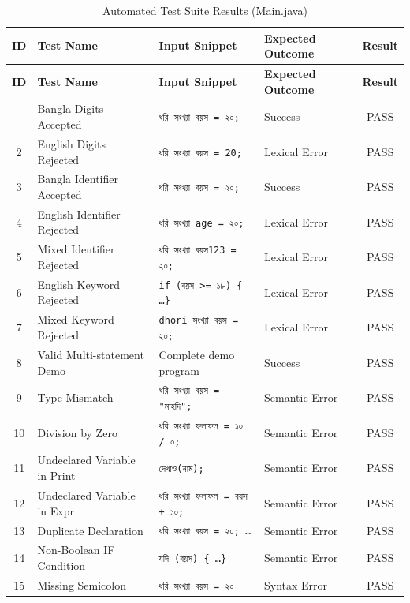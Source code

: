 \documentclass[12pt, a4paper]{report}
\begin{document}
\renewcommand{\arraystretch}{1.25}
\noindent\begin{longtable}{|c|>{\raggedright\arraybackslash}p{2.8cm}|>{\raggedright\arraybackslash}p{3.8cm}|>{\raggedright\arraybackslash}p{3.8cm}|c|}
\hline
\textbf{ID} & \textbf{Test Name} & \textbf{Input Snippet} & \textbf{Expected Outcome} & \textbf{Result} \\
\hline
\endfirsthead
\hline
\textbf{ID} & \textbf{Test Name} & \textbf{Input Snippet} & \textbf{Expected Outcome} & \textbf{Result} \\
\hline
\endhead
\hline
\endfoot
\hline
\caption{Automated Test Suite Results (Main.java)}
\label{tab:test_suite}
\endlastfoot
1 & Bangla Digits Accepted & \texttt{ধরি সংখ্যা বয়স = ২০;} & Success & PASS \\
\hline
2 & English Digits Rejected & \texttt{ধরি সংখ্যা বয়স = 20;} & Lexical Error & PASS \\
\hline
3 & Bangla Identifier Accepted & \texttt{ধরি সংখ্যা বয়স = ২০;} & Success & PASS \\
\hline
4 & English Identifier Rejected & \texttt{ধরি সংখ্যা age = ২০;} & Lexical Error & PASS \\
\hline
5 & Mixed Identifier Rejected & \texttt{ধরি সংখ্যা বয়স123 = ২০;} & Lexical Error & PASS \\
\hline
6 & English Keyword Rejected & \texttt{if (বয়স >= ১৮) \{ \dots \}} & Lexical Error & PASS \\
\hline
7 & Mixed Keyword Rejected & \texttt{dhori সংখ্যা বয়স = ২০;} & Lexical Error & PASS \\
\hline
8 & Valid Multi-statement Demo & Complete demo program & Success & PASS \\
\hline
9 & Type Mismatch & \texttt{ধরি সংখ্যা বয়স = "মাহদি";} & Semantic Error & PASS \\
\hline
10 & Division by Zero & \texttt{ধরি সংখ্যা ফলাফল = ১০ / ০;} & Semantic Error & PASS \\
\hline
11 & Undeclared Variable in Print & \texttt{দেখাও(নাম);} & Semantic Error & PASS \\
\hline
12 & Undeclared Variable in Expr & \texttt{ধরি সংখ্যা ফলাফল = বয়স + ১০;} & Semantic Error & PASS \\
\hline
13 & Duplicate Declaration & \texttt{ধরি সংখ্যা বয়স = ২০; \dots} & Semantic Error & PASS \\
\hline
14 & Non-Boolean IF Condition & \texttt{যদি (বয়স) \{ \dots \}} & Semantic Error & PASS \\
\hline
15 & Missing Semicolon & \texttt{ধরি সংখ্যা বয়স = ২০} & Syntax Error & PASS \\

\end{longtable}
\end{document}
